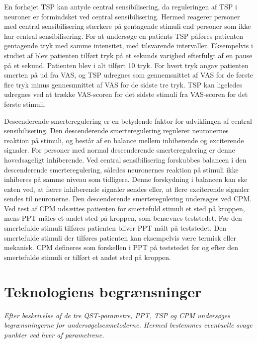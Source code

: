 En forhøjet TSP kan antyde central sensibilisering, da reguleringen af TSP i neuroner er formindsket ved central sensibilisering. \citep{Arendt-Nielsen2015b} Hermed reagerer personer med central sensibilisering stærkere på gentagende stimuli end personer som ikke har central sensibilisering. \citep{Arendt-Nielsen2015b} For at undersøge en patients TSP påføres patienten gentagende tryk med samme intensitet, med tilsvarende intervaller. Eksempelvis i studiet af \citep{Petersen2016} blev patienten tilført tryk på et sekunds varighed efterfulgt af en pause på et sekund. Patienten blev i alt tilført 10 tryk. For hvert tryk angav patienten smerten på ud fra VAS, og TSP udregnes som gennemsnittet af VAS for de første fire tryk minus gennesmnittet af VAS for de sidste tre tryk. \citep{Petersen2016} TSP kan ligeledes udregnes ved at trække VAS-scoren for det sidste stimuli fra VAS-scoren for det første stimuli. \citep{Petersen2015} 

Descenderende smerteregulering er en betydende faktor for udviklingen af central sensibilisering. Den descenderende smerteregulering regulerer neuronernes reaktion på stimuli, og består af en balance mellem inhiberende og exciterende signaler. For personer med normal descenderende smerteregulering er denne hovedsageligt inhiberende. Ved central sensibilisering forskubbes balancen i den descenderende smerteregulering, således neuronernes reaktion på stimuli ikke inhiberes på samme niveau som tidligere. Denne forskydning i balancen kan ske enten ved, at færre inhiberende signaler sendes eller, at flere exciterende signaler sendes til neuronerne. \citep{Arendt-Nielsen2015b} Den descenderende smerteregulering undersøges ved CPM. Ved test af CPM udsættes patienten for smertefuld stimuli et sted på kroppen, mens PPT måles et andet sted på kroppen, som benævnes teststedet. Før den smertefulde stimuli tilføres patienten bliver PPT målt på teststedet. \citep{Petersen2016} Den smertefulde stimuli der tilføres patienten kan eksempelvis være termisk eller mekanisk. CPM defineres som forskellen i PPT på teststedet før og efter den smertefulde stimuli er tilført et andet sted på kroppen. \citep{Petersen2015} 

\section{Teknologiens begrænsninger}
\textit{Efter beskrivelse af de tre QST-parametre, PPT, TSP og CPM undersøges begrænsningerne for undersøgelsesmetoderne. Hermed bestemmes eventuelle svage punkter ved hver af parametrene.}

